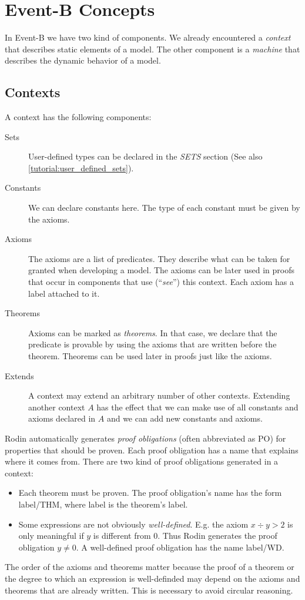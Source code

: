 \newcommand{\eventbpo}[1]{\textsf{#1}}

\section{Event-B Concepts}
\label{tutorial_06}

In Event-B we have two kind of components.
We already encountered a \emph{context} that describes static elements of a model.
The other component is a \emph{machine} that describes the dynamic behavior of a model.

\subsection{Contexts}
\label{tutorial:contexts}

A context has the following components:
\begin{description}
\item[Sets]
  User-defined types can be declared in the \textsl{SETS} section
  (See also \ref{tutorial:user_defined_sets}).
\item[Constants]
  We can declare constants here. The type of each constant must be given
  by the axioms.
\item[Axioms] The axioms are a list of predicates. 
  They describe what can be taken for granted when developing a model.
  The axioms can be later used in proofs that occur in components that
  use (``\emph{see}'') this context.
  Each axiom has a label attached to it.
\item[Theorems] 
  Axioms can be marked as \emph{theorems}. In that case, we declare that
  the predicate is provable by using the axioms that are written 
  before the theorem.
  Theorems can be used later in proofs just like the axioms.
\item[Extends]
  A context may extend an arbitrary number of other contexts.
  Extending another context $A$ has the effect that we can make use of
  all constants and axioms declared in $A$ and we can add new constants
  and axioms.
\end{description}
Rodin automatically generates \emph{proof obligations} (often abbreviated as PO) for properties that
should be proven. Each proof obligation has a name that explains where it comes from.
There are two kind of proof obligations generated in a context:
\begin{itemize}
  \item Each theorem must be proven. The proof obligation's name has the form 
    \eventbpo{label/THM}, where \eventbpo{label} is the theorem's label.
  \item Some expressions are not obviously \emph{well-defined}.
    E.g. the axiom $x \div y > 2$ is only meaningful if $y$ is different from 0.
    Thus Rodin generates the proof obligation $y\neq 0$.
    A well-defined proof obligation has the name \eventbpo{label/WD}.
\end{itemize}
The order of the axioms and theorems matter because the proof of a theorem or the degree to which an expression is well-definded may depend on the axioms and theorems that are already written. This is necessary to avoid circular reasoning.


